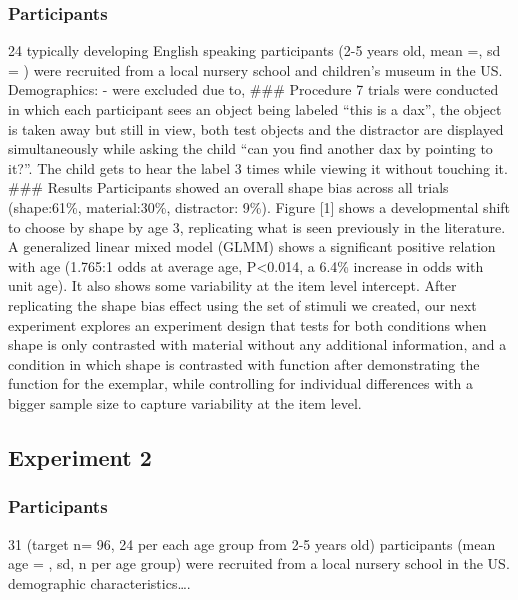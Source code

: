 \documentclass[10pt, letterpaper]{article}
\begin{document}
\hypertarget{participants}{%
\subsubsection{Participants}\label{participants}}

24 typically developing English speaking participants (2-5 years old,
mean =, sd = ) were recruited from a local nursery school and children's
museum in the US. Demographics: - were excluded due to, \#\#\# Procedure
7 trials were conducted in which each participant sees an object being
labeled ``this is a dax'', the object is taken away but still in view,
both test objects and the distractor are displayed simultaneously while
asking the child ``can you find another dax by pointing to it?''. The
child gets to hear the label 3 times while viewing it without touching
it. \#\#\# Results Participants showed an overall shape bias across all
trials (shape:61\%, material:30\%, distractor: 9\%). Figure {[}1{]}
shows a developmental shift to choose by shape by age 3, replicating
what is seen previously in the literature. A generalized linear mixed
model (GLMM) shows a significant positive relation with age (1.765:1
odds at average age, P\textless0.014, a 6.4\% increase in odds with unit
age). It also shows some variability at the item level intercept. After
replicating the shape bias effect using the set of stimuli we created,
our next experiment explores an experiment design that tests for both
conditions when shape is only contrasted with material without any
additional information, and a condition in which shape is contrasted
with function after demonstrating the function for the exemplar, while
controlling for individual differences with a bigger sample size to
capture variability at the item level.

\hypertarget{experiment-2}{%
\subsection{Experiment 2}\label{experiment-2}}

\hypertarget{participants-1}{%
\subsubsection{Participants}\label{participants-1}}

31 (target n= 96, 24 per each age group from 2-5 years old) participants
(mean age = , sd, n per age group) were recruited from a local nursery
school in the US. demographic characteristics\ldots.
\end{document}

